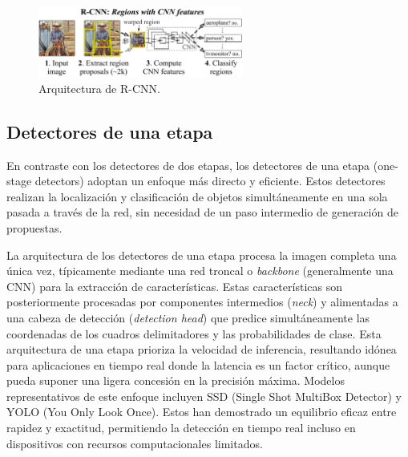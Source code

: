 \documentclass[11pt,spanish,listoffigures,listoftables]{tfgetsinf}
\begin{document}
\begin{figure}[H]
   \centering
   \includegraphics[width=0.6\textwidth]{images/estado_del_arte/R-CNN.png}
   \caption{Arquitectura de R-CNN.}
   \label{fig:r-cnn}
\end{figure}

\subsection{Detectores de una etapa}

En contraste con los detectores de dos etapas, los detectores de una etapa (one-stage detectors) adoptan un enfoque más directo y eficiente. Estos detectores realizan la localización y clasificación de objetos simultáneamente en una sola pasada a través de la red, sin necesidad de un paso intermedio de generación de propuestas.

La arquitectura de los detectores de una etapa procesa la imagen completa una única vez, típicamente mediante una red troncal o \textit{backbone} (generalmente una CNN) para la extracción de características. Estas características son posteriormente procesadas por componentes intermedios (\textit{neck}) y alimentadas a una cabeza de detección (\textit{detection head}) que predice simultáneamente las coordenadas de los cuadros delimitadores y las probabilidades de clase. 
Esta arquitectura de una etapa prioriza la velocidad de inferencia, resultando idónea para aplicaciones en tiempo real donde la latencia es un factor crítico, aunque pueda suponer una ligera concesión en la precisión máxima. Modelos representativos de este enfoque incluyen SSD (Single Shot MultiBox Detector)\cite{Liu_2016} y YOLO (You Only Look Once)\cite{redmon2016lookonceunifiedrealtime}. Estos han demostrado un equilibrio eficaz entre rapidez y exactitud, permitiendo la detección en tiempo real incluso en dispositivos con recursos computacionales limitados.
\end{document}
